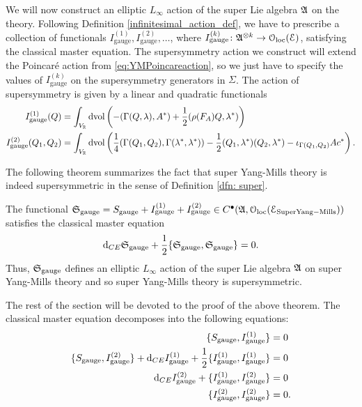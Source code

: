 \documentclass[10pt, oneside]{article}
\newcommand{\gauge}{\mathrm{gauge}}
\begin{document}
We will now construct an elliptic $L_\infty$ action of the super Lie algebra $\mathfrak{A}$ on the theory. 
Following Definition \ref{infinitesimal_action_def}, we have to prescribe a collection of functionals $I_{\gauge}^{(1)}, I_{\gauge}^{(2)}, \dots$, where $I_{\gauge}^{(k)}\colon \mf{A}^{\otimes k}\rightarrow \oloc(\cE)$, satisfying the classical master equation. The supersymmetry action we construct will extend the Poincar\'{e} action from \eqref{eq:YMPoincareaction}, so we just have to specify the values of $I_{\gauge}^{(k)}$ on the supersymmetry generators in $\Sigma$. The action of supersymmetry is given by a linear and quadratic functionals
\begin{align*}
I_{\gauge}^{(1)}(Q) &= \int_{V_\RR}\dvol\left( -(\Gamma(Q, \lambda), A^*) + \frac{1}{2}(\rho(F_A)Q, \lambda^*)\right) \\
I_{\gauge}^{(2)}(Q_1, Q_2) &= \int_{V_\RR}\dvol\left( \frac{1}{4}(\Gamma(Q_1, Q_2), \Gamma(\lambda^*, \lambda^*)) - \frac{1}{2}(Q_1, \lambda^*)(Q_2, \lambda^*) - \iota_{\Gamma(Q_1, Q_2)} A c^*\right).
\end{align*}

The following theorem summarizes the fact that super Yang-Mills theory is indeed supersymmetric in the sense of Definition \ref{dfn: super}. 

\begin{thm}\label{thm:gaugemultipletSUSY}
The functional $\fS_{\gauge} = S_{\gauge} + I_{\gauge}^{(1)} + I_{\gauge}^{(2)} \in C^\bu(\mf{A}, \oloc(\cE_{\rm Super Yang-Mills}))$ satisfies the classical master equation
\[\d_{CE} \fS_{\gauge} + \frac{1}{2}\{\fS_{\gauge}, \fS_{\gauge}\} = 0.\]
Thus, $\fS_{\gauge}$ defines an elliptic $L_\infty$ action of the super Lie algebra $\mathfrak A$ on super Yang-Mills theory and so super Yang-Mills theory is supersymmetric.  
\end{thm}

The rest of the section will be devoted to the proof of the above theorem. The classical master equation decomposes into the following equations:
\begin{align*}
\{S_{\gauge}, I_{\gauge}^{(1)}\} &= 0 \\
\{S_{\gauge}, I_{\gauge}^{(2)}\} + \d_{CE} I_{\gauge}^{(1)} + \frac{1}{2}\{I_{\gauge}^{(1)}, I_{\gauge}^{(1)}\} &= 0 \\
\d_{CE} I_{\gauge}^{(2)} + \{I_{\gauge}^{(1)}, I_{\gauge}^{(2)}\} &= 0 \\
\{I_{\gauge}^{(2)}, I_{\gauge}^{(2)}\} &= 0.
\end{align*}
\end{document}
